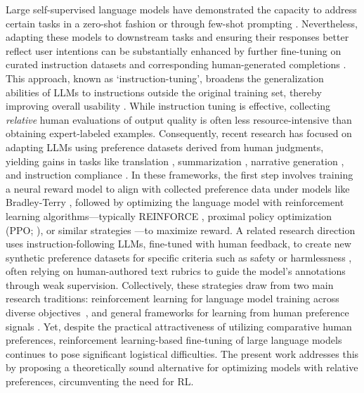 Large self-supervised language models have demonstrated the capacity to address certain tasks in a zero-shot fashion \citep{radford2019language} or through few-shot prompting \citep{gpt3,megatron,chowdhery2022palm}. Nevertheless, adapting these models to downstream tasks and ensuring their responses better reflect user intentions can be substantially enhanced by further fine-tuning on curated instruction datasets and corresponding human-generated completions \citep{mishra-etal-2022-cross,sanh2022multitask,chung2022scaling,thoppilan2022lamda}. This approach, known as `instruction-tuning', broadens the generalization abilities of LLMs to instructions outside the original training set, thereby improving overall usability \citep{chung2022scaling}. While instruction tuning is effective, collecting \textit{relative} human evaluations of output quality is often less resource-intensive than obtaining expert-labeled examples. Consequently, recent research has focused on adapting LLMs using preference datasets derived from human judgments, yielding gains in tasks like translation \citep{kreutzer-etal-2018-reliability}, summarization \citep{stiennon2022learning,ziegler2020finetuning}, narrative generation \citep{ziegler2020finetuning}, and instruction compliance \citep{ouyang2022training,ramamurthy2023is}. In these frameworks, the first step involves training a neural reward model to align with collected preference data under models like Bradley-Terry \citep{bradley1952rankanalysis}, followed by optimizing the language model with reinforcement learning algorithms—typically REINFORCE \citep{williams1992reinforce}, proximal policy optimization (PPO; \cite{schulman2017proximal}), or similar strategies \citep{ramamurthy2023is}—to maximize reward. A related research direction uses instruction-following LLMs, fine-tuned with human feedback, to create new synthetic preference datasets for specific criteria such as safety or harmlessness \citep{bai2022constitutional}, often relying on human-authored text rubrics to guide the model's annotations through weak supervision. Collectively, these strategies draw from two main research traditions: reinforcement learning for language model training across diverse objectives~\citep{Ranzato2015SequenceLT,paulus2018a,wu2018learning}, and general frameworks for learning from human preference signals \citep{christiano2017deep,kupcsik2018learning}. Yet, despite the practical attractiveness of utilizing comparative human preferences, reinforcement learning-based fine-tuning of large language models continues to pose significant logistical difficulties. The present work addresses this by proposing a theoretically sound alternative for optimizing models with relative preferences, circumventing the need for RL.

